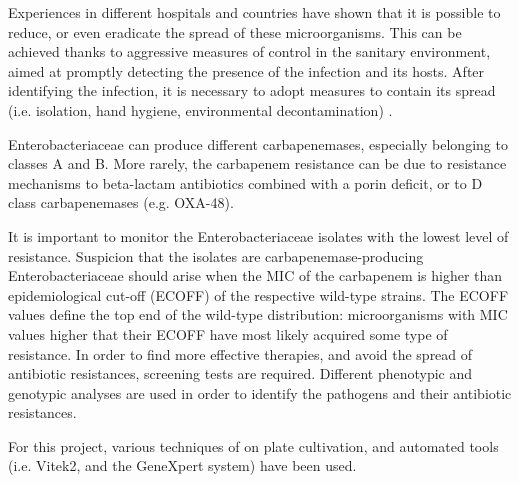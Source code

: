 \documentclass[11pt]{report}
\begin{document}
Experiences in different hospitals and countries have shown that it is possible to reduce, or even eradicate the spread of these microorganisms.
This can be achieved thanks to aggressive measures of control in the sanitary environment, aimed at promptly detecting the presence of the infection and its hosts.
After identifying the infection, it is necessary to adopt measures to contain its spread (i.e. isolation, hand hygiene, environmental decontamination) \cite{gupta2011carbapenem}.

Enterobacteriaceae can produce different carbapenemases, especially belonging to classes A and B.
More rarely, the carbapenem resistance can be due to resistance mechanisms to beta-lactam antibiotics combined with a porin deficit, or to D class carbapenemases (e.g. OXA-48).

It is important to monitor the Enterobacteriaceae isolates with the lowest level of resistance.
Suspicion that the isolates are carbapenemase-producing Enterobacteriaceae should arise when the MIC of the carbapenem is higher than epidemiological cut-off (ECOFF) of the respective wild-type strains.
The ECOFF values define the top end of the wild-type distribution: microorganisms with MIC values higher that their ECOFF have most likely acquired some type of resistance.
In order to find more effective therapies, and avoid the spread of antibiotic resistances, screening tests are required.
Different phenotypic and genotypic analyses are used in order to identify the pathogens and their antibiotic resistances.

For this project, various techniques of on plate cultivation, and automated tools (i.e. Vitek2, and the GeneXpert system) have been used.
\end{document}

